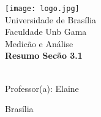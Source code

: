 \begin{titlepage}
        \begin{center}
            \texttt{[image: logo.jpg]}\\[0.3cm]
            {\large Universidade de Brasília}\\[0.2cm]
            {\large Faculdade Unb Gama}\\[0.2cm]
            {\large Medicão e Análise}\\[4.1cm]
            {\bf \huge Resumo Secão 3.1}\\[4.1cm]
        \end{center}
        \\[0.7cm]
        {\normalsize Professor(a): Elaine}
        \vfill
        \begin{center}
            {\large Brasília}\\[0.2cm]
            {\large \the\year}
        \end{center}
\end{titlepage}
